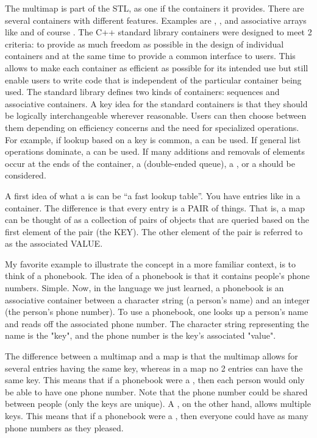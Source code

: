 The multimap is part of the STL, as one if the containers it provides.  There are
several containers with different features.  Examples	
are , , and associative arrays like  and of
course .  The C++ standard library
      containers were designed to meet 2 criteria: to provide as much freedom
      as possible in the design of individual containers and at the same
      time to provide a common interface to users.  This allows to make
      each container as efficient as possible for its intended use but
      still enable users to write code that is independent of the
      particular container being used.
      The standard library defines two kinds of containers: sequences and
      associative containers.  A key idea for the standard containers is that
      they should be logically interchangeable wherever reasonable.  Users can
      then choose between them depending on efficiency concerns and the
      need for specialized operations.  For example, if lookup based on
      a key is common, a  can be used.  If general list operations
      dominate, a  can be used.  If many additions and removals of
      elements occur at the ends of the container, a  (double-ended
      queue), a , or a  should be considered.

A first idea of what a  is can be ``a fast lookup table''.  You have entries
like in a  container.  The difference is that every entry is a PAIR of
things.  
That is, a map can be thought of as a collection of pairs of
objects that are queried based on the first
element of the pair (the KEY). 
The other element of the pair is referred to as the associated VALUE.

My favorite example to  illustrate
      the concept
      in a more familiar context, is to think of a phonebook.
The idea of a phonebook is
      that it
      contains people's phone numbers.  Simple.  Now, in the language we just learned,
      a phonebook is an associative
      container between a
      character string (a person's name) and an integer (the person's phone number).
      To use a
      phonebook,
      one looks up a person's name and reads off the associated phone number.  The character
      string representing the name is the "key", and the phone number is the key's
      associated "value".  

The difference between a multimap and a map is that the multimap allows for
several entries having the same key, whereas in a map no 2 entries can have the same
key.
This means that if a phonebook were a ,
      then each person would only
      be able to have one phone number. Note that the phone number could be shared between
      people
      (only the keys
      are unique).  A , on the other hand,
      allows multiple keys.  This means that if a phonebook were a
, then everyone
      could have
      as many phone numbers as they pleased.

